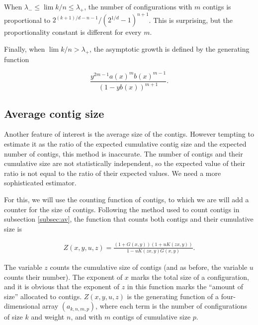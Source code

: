 \documentclass{article}
\begin{document}
When $\lambda_- \leq \lim k/n \leq \lambda_+$, the number of
configurations with $m$ contigs is proportional to
$2^{(k+1)/d-n-1}/(2^{1/d}-1)^{n+1}$. This is surprising, but the
proportionality constant is different for every $m$.


Finally, when $\lim k/n > \lambda_+$, the asymptotic growth is defined by
the generating function

\begin{equation*}
\frac{y^{2m-1}a(x)^mb(x)^{m-1}}{\left(1-yb(x)\right)^{m+1}}.
\end{equation*}





\subsection{Average contig size}
\label{subsec:avctsz}

Another feature of interest is the average size of the contigs. However
tempting to estimate it as the ratio of the expected cumulative contig
size and the expected number of contigs, this method is inaccurate. The
number of contigs and their cumulative size are not statistically
independent, so the expected value of their ratio is not equal to the
ratio of their expected values. We need a more sophisticated estimator.

For this, we will use the counting function of contigs, to which we are
will add a counter for the size of contigs. Following the method used to
count contigs in subsection \ref{subsec:av}, the function that counts
both contigs and their cumulative size is

\begin{equation*}
\begin{split}
Z(x,y,u,z) = \frac{(1+G(x,y))(1+uK(zx,y))}{1-uK(zx,y)G(x,y)}.
\end{split}
\end{equation*}

The variable $z$ counts the cumulative size of contigs (and as before, the
variable $u$ counts their number). The exponent of $x$ marks the total
size of a configuration, and it is obvious that the exponent of $z$ in
this function marks the ``amount of size'' allocated to contigs.
$Z(x,y,u,z)$ is the generating function of a four-dimensional array
$(a_{k,n,m,p})$, where each term is the number of configurations of size
$k$ and weight $n$, and with $m$ contigs of cumulative size $p$.
\end{document}
